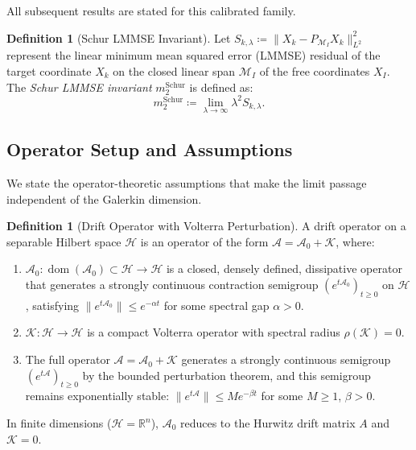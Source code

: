 \documentclass[11pt]{amsart}
\theoremstyle{plain}
\theoremstyle{definition}
\newtheorem{definition}[theorem]{Definition}
\theoremstyle{remark}
\begin{document}
All subsequent results are stated for this calibrated family.

\begin{definition}[Schur LMMSE Invariant]
  \label{def:schur_invariant}
  Let $S_{k,\lambda} \coloneqq \|X_k - P_{\mathcal{M}_I} X_k\|_{L^2}^2$ represent the linear minimum mean squared error (LMMSE) residual of the target coordinate $X_k$ on the closed linear span $\mathcal{M}_I$ of the free coordinates $X_I$. The \emph{Schur LMMSE invariant} $m_2^{\mathrm{Schur}}$ is defined as:
  \begin{equation}
    \label{eq:m2_schur_definition}
    m_2^{\mathrm{Schur}} \coloneqq \lim_{\lambda\to\infty} \lambda^2 S_{k,\lambda}.
  \end{equation}
\end{definition}

\subsection{Operator Setup and Assumptions}
\label{sec:setup:assumptions}

We state the operator-theoretic assumptions that make the limit passage independent of the Galerkin dimension.

\begin{definition}[Drift Operator with Volterra Perturbation]
  \label{def:drift_operator}
  A drift operator on a separable Hilbert space $\mathcal{H}$ is an operator of the form $\mathcal{A} = \mathcal{A}_0 + \mathcal{K}$, where:
  \begin{enumerate}
    \item[(i)] $\mathcal{A}_0: \operatorname{dom}(\mathcal{A}_0) \subset \mathcal{H} \to \mathcal{H}$ is a closed, densely defined, dissipative operator that generates a strongly continuous contraction semigroup $(e^{t\mathcal{A}_0})_{t \ge 0}$ on $\mathcal{H}$, satisfying $\|e^{t\mathcal{A}_0}\| \le e^{-\alpha t}$ for some spectral gap $\alpha > 0$.
    \item[(ii)] $\mathcal{K}: \mathcal{H} \to \mathcal{H}$ is a compact Volterra operator with spectral radius $\rho(\mathcal{K}) = 0$.
    \item[(iii)] The full operator $\mathcal{A} = \mathcal{A}_0 + \mathcal{K}$ generates a strongly continuous semigroup $(e^{t\mathcal{A}})_{t \ge 0}$ by the bounded perturbation theorem, and this semigroup remains exponentially stable: $\|e^{t\mathcal{A}}\| \le M e^{-\beta t}$ for some $M \ge 1$, $\beta > 0$.
  \end{enumerate}
  In finite dimensions ($\mathcal{H} = \mathbb{R}^n$), $\mathcal{A}_0$ reduces to the Hurwitz drift matrix $A$ and $\mathcal{K} = 0$.
\end{definition}
\end{document}
